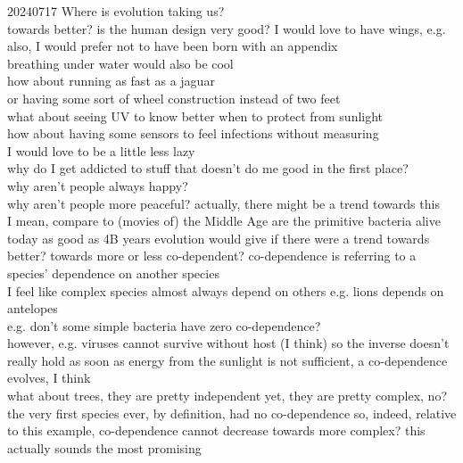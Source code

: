 \documentclass{article}\usepackage[margin=2cm]{geometry}
\begin{document}
\begin{cascade}
    20240717
    \stepin
    Where is evolution taking us?\\
    towards better?
    \stepin
    is the human design very good?
    \stepin
    I would love to have wings, e.g.\\
    also, I would prefer not to have been born with an appendix\\
    breathing under water would also be cool\\
    how about running as fast as a jaguar\\
    or having some sort of wheel construction instead of two feet\\
    what about seeing UV to know better when to protect from sunlight\\
    how about having some sensors to feel infections without measuring\\
    I would love to be a little less lazy\\
    why do I get addicted to stuff that doesn't do me good in the first place?\\
    why aren't people always happy?\\
    why aren't people more peaceful?
    \stepin
    actually, there might be a trend towards this\\
    I mean, compare to (movies of) the Middle Age
    \stepout
    \stepout
    are the primitive bacteria alive today as good as 4B years evolution would give if there were a trend towards better?
    \stepout
    towards more or less co-dependent?
    \stepin
    co-dependence is referring to a species' dependence on another species\\
    I feel like complex species almost always depend on others
    \stepin
    e.g. lions depends on antelopes\\
    e.g. don't some simple bacteria have zero co-dependence?\\
    however, e.g. viruses cannot survive without host (I think)
    \stepin
    so the inverse doesn't really hold
    \stepout
    as soon as energy from the sunlight is not sufficient, a co-dependence evolves, I think\\
    what about trees, they are pretty independent
    \stepin
    yet, they are pretty complex, no?
    \stepout
    \stepout
    the very first species ever, by definition, had no co-dependence
    \stepin
    so, indeed, relative to this example, co-dependence cannot decrease
    \stepout
    \stepout
    towards more complex?
    \stepin
    this actually sounds the most promising\\

\end{cascade}
\end{document}
